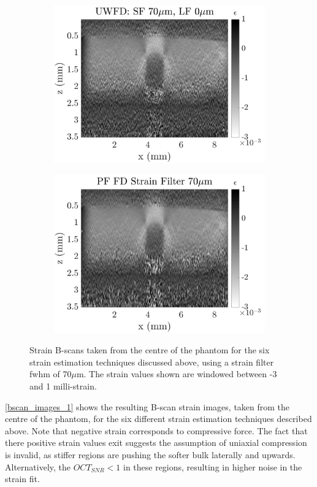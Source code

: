 \begin{figure}[b!]
\begin{subfigure}{0.49\textwidth}
        \includegraphics[width=\textwidth]{figures/uwfd_fr70_lr0.png}
	\end{subfigure}
    \begin{subfigure}{0.49\textwidth}
    	\centering
        \includegraphics[width=\textwidth]{figures/fdsm_fr70_lr0.png}
    \end{subfigure}
	\caption{Strain B-scans taken from the centre of the phantom for the six strain estimation techniques discussed above, using a strain filter \ac{fwhm} of 70$\mu$m. The strain values shown are windowed between -3 and 1 milli-strain.}
    \label{bscan_images_1}	
\end{figure}

\autoref{bscan_images_1} shows the resulting B-scan strain images, taken from the centre of the phantom, for the six different strain estimation techniques described above. Note that negative strain corresponds to compressive force. The fact that there positive strain values exit suggests the assumption of uniaxial compression is invalid, as stiffer regions are pushing the softer bulk laterally and upwards. Alternatively, the $OCT_{SNR}<1$ in these regions, resulting in higher noise in the strain fit.

